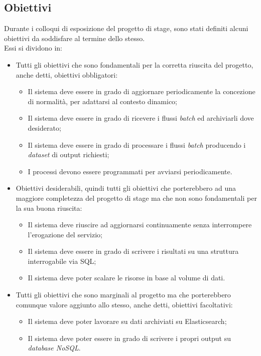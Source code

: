 \subsection{Obiettivi}
Durante i colloqui di esposizione del progetto di stage, sono stati definiti alcuni obiettivi da soddisfare al termine dello stesso.\\
Essi si dividono in:
\begin{itemize}
	\item Tutti gli obiettivi che sono fondamentali per la corretta riuscita del progetto, anche detti, obiettivi obbligatori:
	\begin{itemize}
		\item Il sistema deve essere in grado di aggiornare periodicamente la concezione di normalità, per adattarsi al contesto dinamico;	 
		\item Il sistema deve essere in grado di ricevere i flussi \emph{batch} ed archiviarli dove desiderato;
		\item Il sistema deve essere in grado di processare i flussi \emph{batch} producendo i \emph{dataset} di output richiesti;
		\item I processi devono essere programmati per avviarsi periodicamente.
	\end{itemize}
	\item Obiettivi desiderabili, quindi tutti gli obiettivi che porterebbero ad una maggiore completezza del progetto di stage ma che non sono fondamentali per la sua buona riuscita:
		\begin{itemize}
		 \item Il sistema deve riuscire ad aggiornarsi continuamente senza interrompere l'erogazione del servizio;
		 \item Il sistema deve essere in grado di scrivere i risultati su una struttura interrogabile via SQL;
		 \item Il sistema deve poter scalare le risorse in base al volume di dati.
		\end{itemize}	
	\item Tutti gli obiettivi che sono marginali al progetto ma che porterebbero comunque valore aggiunto allo stesso, anche detti, obiettivi facoltativi:
	\begin{itemize}
		\item Il sistema deve poter lavorare su dati archiviati su Elasticsearch;
		\item Il sistema deve poter essere in grado di scrivere i propri output su \emph{database NoSQL}. 
	\end{itemize}
\end{itemize}
